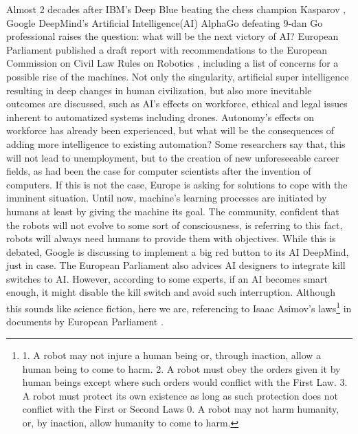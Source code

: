 Almost 2 decades after IBM's Deep Blue beating the chess champion Kasparov \cite{deepBlue}, Google DeepMind's Artificial Intelligence(AI) AlphaGo defeating 9-dan Go professional raises the question: what will be the next victory of AI?
European Parliament published a draft report with recommendations to the European Commission on Civil Law Rules on Robotics \cite{delvaux2017report}, including a list of concerns for a possible rise of the machines. 
Not only the singularity, artificial super intelligence resulting in deep changes in human civilization, but also more inevitable outcomes are discussed, such as AI's effects on workforce, ethical and legal issues inherent to automatized systems including drones.
Autonomy's effects on workforce has already been experienced, but what will be the consequences of adding more intelligence to existing automation? 
Some researchers say that, this will not lead to unemployment, but to the creation of new unforeseeable career fields, as had been the case for computer scientists after the invention of computers. 
If this is not the case, Europe is asking for solutions to cope with the imminent situation.
Until now, machine's learning processes are initiated by humans at least by giving the machine its goal. 
The community, confident that the robots will not evolve to some sort of consciousness, is referring to this fact, robots will always need humans to provide them with objectives. 
While this is debated, Google is discussing to implement a big red button to its AI DeepMind, just in case. 
The European Parliament also advices AI designers to integrate kill switches to AI. 
However, according to some experts, if an AI becomes smart enough, it might disable the kill switch and avoid such interruption. 
Although this sounds like science fiction, here we are, referencing to Isaac Asimov's laws\footnote{1. A robot may not injure a human being or, through inaction, allow a human being to come to harm. 2. A robot must obey the orders given it by human beings except where such orders would conflict with the First Law. 3. A robot must protect its own existence as long as such protection does not conflict with the First or Second Laws \cite{asimovLaws} 0. A robot may not harm humanity, or, by inaction, allow humanity to come to harm.} in documents by European Parliament \cite{civilLawRulesOnRobotics}.

